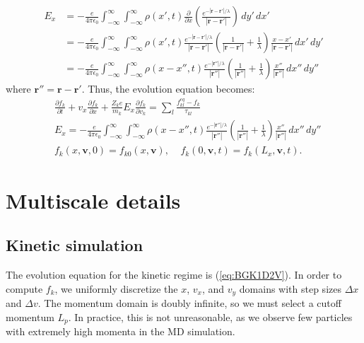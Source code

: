 \documentclass{article}
\begin{document}
\begin{align*}
E_x&=-\frac{e}{4\pi\epsilon_0}\int_{-\infty}^\infty\int_{-\infty}^\infty  \rho(x',t)\frac{\partial}{\partial x}\left(\frac{e^{-|\mathbf{r}-\mathbf{r}'|/\lambda}}{|\mathbf{r}-\mathbf{r}'|}\right)\,dy'\,dx'\\
&=-\frac{e}{4\pi\epsilon_0}\int_{-\infty}^\infty\int_{-\infty}^\infty  \rho(x',t)\frac{e^{-|\mathbf{r}-\mathbf{r}'|/\lambda}}{|\mathbf{r}-\mathbf{r}'|}\left(\frac{1}{|\mathbf{r}-\mathbf{r}'|}+\frac{1}{\lambda}\right)\frac{x-x'}{|\mathbf{r}-\mathbf{r}'|}\,dx'\,dy'\\
&=-\frac{e}{4\pi\epsilon_0}\int_{-\infty}^\infty\int_{-\infty}^\infty\rho(x-x'',t)\frac{e^{-|\mathbf{r}''|/\lambda}}{|\mathbf{r}''|}\left(\frac{1}{|\mathbf{r}''|}+\frac{1}{\lambda}\right)\frac{x''}{|\mathbf{r}''|}\,dx''\,dy''
\end{align*}where $\mathbf{r}''=\mathbf{r}-\mathbf{r}'$. Thus, the evolution equation becomes:
\begin{equation}
\begin{split}
&\frac{\partial f_k}{\partial t}+v_x\frac{\partial f_k}{\partial x}+\frac{Z_ke}{m_k}E_x\frac{\partial f_k}{\partial v_k}=\sum_l\frac{f_{kl}^{eq}-f_k}{\tau_{kl}}\\
&E_x=-\frac{e}{4\pi\epsilon_0}\int_{-\infty}^\infty\int_{-\infty}^\infty\rho(x-x'',t)\frac{e^{-|\mathbf{r}''|/\lambda}}{|\mathbf{r}''|}\left(\frac{1}{|\mathbf{r}''|}+\frac{1}{\lambda}\right)\frac{x''}{|\mathbf{r}''|}\,dx''\,dy''\\
&f_k(x,\mathbf{v},0)=f_{k0}(x,\mathbf{v}),\;\;\;\;
f_k(0,\mathbf{v},t)=f_{k}(L_x,\mathbf{v},t).
\end{split}\label{eq:BGK1D2V}
\end{equation}

\section{Multiscale details}

\subsection{Kinetic simulation}

The evolution equation for the kinetic regime is (\ref{eq:BGK1D2V}). In order to compute $f_k$, we uniformly discretize the $x$, $v_x$, and $v_y$ domains with step sizes $\Delta x$ and $\Delta v$. The momentum domain is doubly infinite, so we must select a cutoff momentum $L_p$. In practice, this is not unreasonable, as we observe few particles with extremely high momenta in the MD simulation. 
\end{document}
